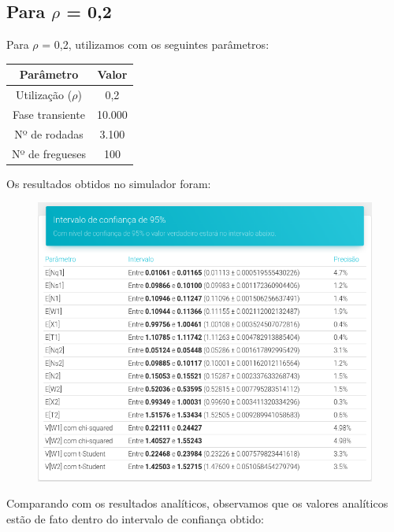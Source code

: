 \documentclass[a4paper,12pt]{report}
\begin{document}
\subsection{Para $\rho$ = 0,2}
Para $\rho$ = 0,2, utilizamos com os seguintes parâmetros:

\vspace{-5mm}
\begin{center}
\begin{tabular}{ c c }
  \hline
  \textbf{Parâmetro} & \textbf{Valor}\\
  \hline
  Utilização ($\rho$) & 0,2\\
  Fase transiente & 10.000\\
  Nº de rodadas & 3.100\\
  Nº de fregueses & 100\\
  \hline
\end{tabular}
\end{center}

Os resultados obtidos no simulador foram:
\begin{figure}[H]
\includegraphics[width=1\textwidth]{./graficos/cap4/rho02.png}
\vspace{-10mm}
\end{figure}

Comparando com os resultados analíticos, observamos que os valores analíticos estão de fato dentro do intervalo de confiança obtido:
\end{document}
